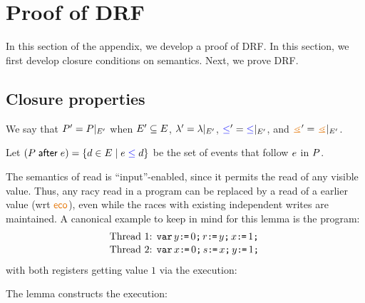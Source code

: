 \section{Proof of DRF}\label{drfproof}

In this section of the appendix, we develop a proof of DRF.  In this section, we first develop closure conditions on semantics.  Next, we prove DRF.

\subsection{Closure properties}

We say that $P' = P\mathbin{|}_{E'}$ when 
 $E' \subseteq E$,
 ${\lambda'} = {\lambda}\mathbin{|}_{E'}$, 
 ${\mathrel{{\color{blue}\leq}}'} = {\mathrel{{\color{blue}\leq}}}\mathbin{|}_{E'}$, and
 ${\gtN'} = {\gtN}\restrict{\Event'}$.

\begin{definition}
Let $(P \mathrel{\mathsf{after}} e) = {\{ d\in E \mid e \mathrel{{\color{blue}\leq}} d
  \}}$ be the set of events that follow $e$ in $P$.
\end{definition}

The semantics of read is ``input''-enabled, since it permits the read of any visible value.   Thus, any racy read in a program can be replaced by a read of a earlier value (wrt $\reco$), even while  the races with existing independent writes are maintained.   A canonical example to keep in mind for this lemma is the program:
\begin{align*}
\mbox{Thread 1: } &\texttt{var}\, y\texttt{:}\mkern-1mu\texttt{=}\, 0 \texttt{;}\, r \texttt{:}\mkern-1mu\texttt{=}\, y  \texttt{;}\, x \texttt{:}\mkern-1mu\texttt{=}\, 1  \texttt{;}\, \\[-.5ex]
\mbox{Thread 2: } &\texttt{var}\, x\texttt{:}\mkern-1mu\texttt{=}\, 0 \texttt{;}\, s \texttt{:}\mkern-1mu\texttt{=}\, x \texttt{;}\, y \texttt{:}\mkern-1mu\texttt{=}\, 1  \texttt{;}\, 
\end{align*}
with both registers getting value $1$ via the execution:
\begin{tikzdisplay}[node distance=1em]
\end{tikzdisplay}
The lemma constructs the execution:
\begin{tikzdisplay}[node distance=1em]
\end{tikzdisplay}


